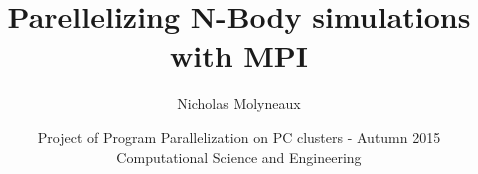 \documentclass[xcolor=dvipsnames]{beamer}
\title{Parellelizing N-Body simulations with MPI}
\subtitle{}
\author{Nicholas Molyneaux}
\date{\scriptsize Project of Program Parallelization on PC clusters - Autumn 2015\\ \vspace{.10cm} Computational Science and Engineering\\ \vspace{.10cm}}
\begin{document}
\frame
\maketitle







\end{document}
